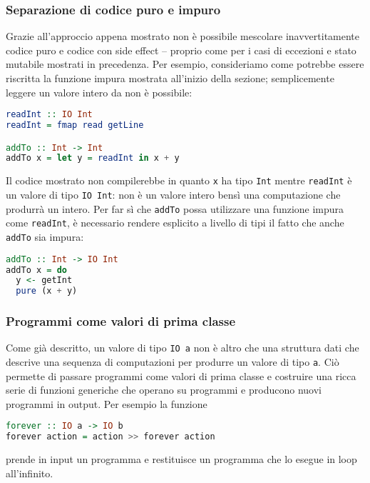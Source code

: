 \subsubsection{Separazione di codice puro e impuro}
Grazie all'approccio appena mostrato non è possibile mescolare inavvertitamente codice puro e codice con side effect -- proprio come per i casi di eccezioni e stato mutabile mostrati in precedenza. Per esempio, consideriamo come potrebbe essere riscritta la funzione impura mostrata all'inizio della sezione; semplicemente leggere un valore intero da  non è possibile:
\begin{lstlisting}[language=haskell]
readInt :: IO Int
readInt = fmap read getLine

addTo :: Int -> Int
addTo x = let y = readInt in x + y
\end{lstlisting}
Il codice mostrato non compilerebbe in quanto \lstinline{x} ha tipo \lstinline{Int} mentre \lstinline{readInt} è un valore di tipo \lstinline{IO Int}: non è un valore intero bensì una computazione che produrrà un intero. Per far sì che \lstinline{addTo} possa utilizzare una funzione impura come \lstinline{readInt}, è necessario rendere esplicito a livello di tipi il fatto che anche \lstinline{addTo} sia impura:
\begin{lstlisting}[language=haskell]
addTo :: Int -> IO Int
addTo x = do
  y <- getInt
  pure (x + y)
\end{lstlisting}

\subsubsection{Programmi come valori di prima classe}
Come già descritto, un valore di tipo \lstinline{IO a} non è altro che una struttura dati che descrive una sequenza di computazioni per produrre un valore di tipo \lstinline{a}. Ciò permette di passare programmi come valori di prima classe e costruire una ricca serie di funzioni generiche che operano su programmi e producono nuovi programmi in output. Per esempio la funzione
\begin{lstlisting}[language=haskell]
forever :: IO a -> IO b
forever action = action >> forever action
\end{lstlisting}
prende in input un programma e restituisce un programma che lo esegue in loop all'infinito.

